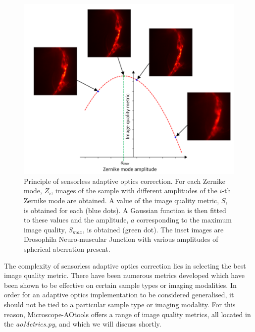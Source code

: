 \begin{figure}[h]
	\centering
	\includegraphics[width=1\textwidth,scale=0.5]{./images/sensorless_aberration_fitting_w_images.png}
	\caption{Principle of sensorless adaptive optics correction. For each Zernike mode, $Z_i$, images of the sample with different amplitudes of the $i$-th Zernike mode are obtained. A value of the image quality metric, $S$, is obtained for each (blue dots). A Gaussian function is then fitted to these values and the amplitude, $a$ corresponding to the maximum image quality, $S_{max}$, is obtained (green dot). The inset images are Drosophila Neuro-muscular Junction with various amplitudes of spherical aberration present.}
	\label{fig:sensorless_correction_method}
\end{figure}

The complexity of sensorless adaptive optics correction lies in selecting the best image quality metric. There have been numerous metrics developed which have been shown to be effective on certain sample types or imaging modalities.\cite{burke2015adaptive,booth2002adaptive,fienup2003aberration,debarre2008adaptive} In order for an adaptive optics implementation to be considered generalised, it should not be tied to a particular sample type or imaging modality. For this reason, Microscope-AOtools offers a range of image quality metrics, all located in the \textit{aoMetrics.py}, and which we will discuss shortly.  

